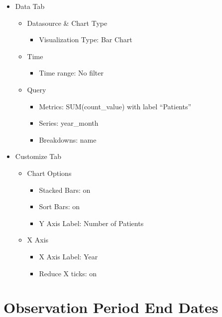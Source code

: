 \documentclass[
]{book}
\providecommand{\tightlist}{%
  \setlength{\itemsep}{0pt}\setlength{\parskip}{0pt}}
\begin{document}
\begin{itemize}
\item
  Data Tab

  \begin{itemize}
  \item
    Datasource \& Chart Type

    \begin{itemize}
    \tightlist
    \item
      Visualization Type: Bar Chart
    \end{itemize}
  \item
    Time

    \begin{itemize}
    \tightlist
    \item
      Time range: No filter
    \end{itemize}
  \item
    Query

    \begin{itemize}
    \item
      Metrics: SUM(count\_value) with label ``Patients''
    \item
      Series: year\_month
    \item
      Breakdowns: name
    \end{itemize}
  \end{itemize}
\item
  Customize Tab

  \begin{itemize}
  \item
    Chart Options

    \begin{itemize}
    \item
      Stacked Bars: on
    \item
      Sort Bars: on
    \item
      Y Axis Label: Number of Patients
    \end{itemize}
  \item
    X Axis

    \begin{itemize}
    \item
      X Axis Label: Year
    \item
      Reduce X ticks: on
    \end{itemize}
  \end{itemize}
\end{itemize}

\hypertarget{observation-period-end-dates}{%
\section{Observation Period End Dates}\label{observation-period-end-dates}}
\end{document}
